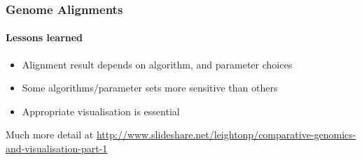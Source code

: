 \documentclass[table]{beamer}
\begin{document}
    \begin{frame}
      \frametitle{Genome Alignments}   
      \framesubtitle{Lessons learned}   
      \begin{itemize}
        \item Alignment result depends on algorithm, and parameter choices
        \item Some algorithms/parameter sets more sensitive than others
        \item Appropriate visualisation is essential
      \end{itemize}
      Much more detail at \url{http://www.slideshare.net/leightonp/comparative-genomics-and-visualisation-part-1}
    \end{frame}


%
\end{document}

